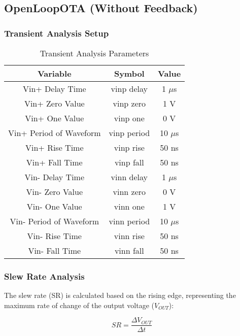 \subsection{OpenLoopOTA (Without Feedback)}

\subsubsection{Transient Analysis Setup}

\begin{table}[h]
    \centering
    \caption{Transient Analysis Parameters}
    \begin{tabular}{|c|c|c|}
        \hline
        \textbf{Variable} & \textbf{Symbol} & \textbf{Value} \\
        \hline
        Vin+ Delay Time & vinp delay & 1 $\mu$s \\
        Vin+ Zero Value & vinp zero & 1 V \\
        Vin+ One Value & vinp one & 0 V \\
        Vin+ Period of Waveform & vinp period & 10 $\mu$s \\
        Vin+ Rise Time & vinp rise & 50 ns \\
        Vin+ Fall Time & vinp fall & 50 ns \\
        Vin- Delay Time & vinn delay & 1 $\mu$s \\
        Vin- Zero Value & vinn zero & 0 V \\
        Vin- One Value & vinn one & 1 V \\
        Vin- Period of Waveform & vinn period & 10 $\mu$s \\
        Vin- Rise Time & vinn rise & 50 ns \\
        Vin- Fall Time & vinn fall & 50 ns \\
        \hline
    \end{tabular}
\end{table}

\subsubsection{Slew Rate Analysis}
The slew rate (SR) is calculated based on the rising edge, representing the maximum rate of change of the output voltage ($V_{OUT}$):

\begin{equation}
    SR = \frac{\Delta V_{OUT}}{\Delta t}
\end{equation}

